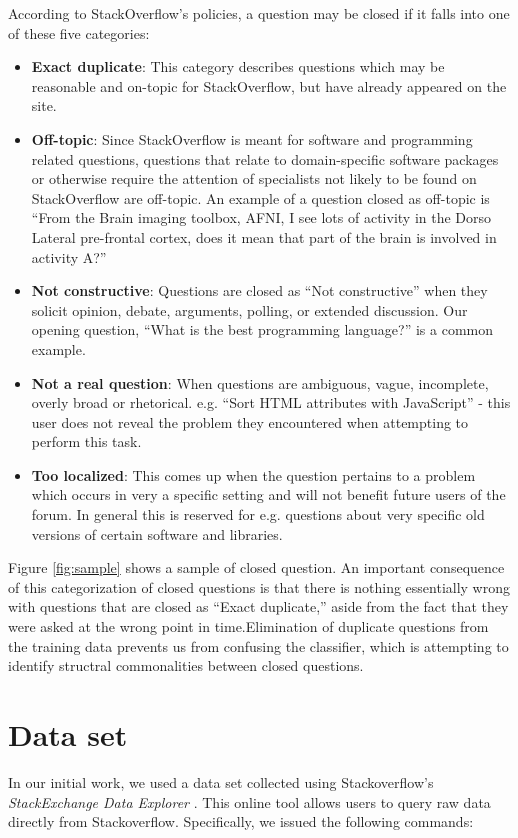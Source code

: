\documentclass[11pt]{article}
\begin{document}
\noindent According to StackOverflow's policies, a question may be
closed if it falls into one of these five categories:

\begin{itemize}
\item \textbf{Exact duplicate}: This category describes questions which may be reasonable and on-topic for StackOverflow, but have already appeared on the site.
\item \textbf{Off-topic}: Since StackOverflow is meant for software and programming related questions, questions that relate to domain-specific software packages or otherwise require the attention of specialists not likely to be found on StackOverflow are off-topic. An example of a question closed as off-topic is ``From the Brain imaging toolbox, AFNI, I see lots of activity in the Dorso Lateral pre-frontal cortex, does it mean that part of the brain is involved in activity A?''
\item \textbf{Not constructive}: Questions are closed as ``Not constructive'' when they solicit opinion, debate, arguments, polling, or extended discussion. Our opening question, ``What is the best programming language?'' is a common example.
\item \textbf{Not a real question}: When questions are ambiguous, vague, incomplete, overly broad or rhetorical. e.g. ``Sort HTML attributes with JavaScript'' - this user does not reveal the problem they encountered when attempting to perform this task.
\item \textbf{Too localized}: This comes up when the question pertains to a problem which occurs in very a specific setting and will not benefit future users of the forum. In general this is reserved for e.g. questions about very specific old versions of certain software and libraries. 
\end{itemize}

\noindent Figure \ref{fig:sample} shows a sample of closed question. An important consequence of this categorization of closed questions is that there is nothing essentially wrong with questions that are closed as ``Exact duplicate,'' aside from the fact that they were asked at the wrong point in time.Elimination of duplicate questions from the training data prevents us from confusing the classifier, which is attempting to identify structral commonalities between closed questions.

\section{Data set}
In our initial work, we used a data set collected using
Stackoverflow's \emph{StackExchange Data Explorer}
\cite{website:stackexchange}. This online tool
allows users to query raw data directly from
Stackoverflow. Specifically, we issued the following commands:
\end{document}
